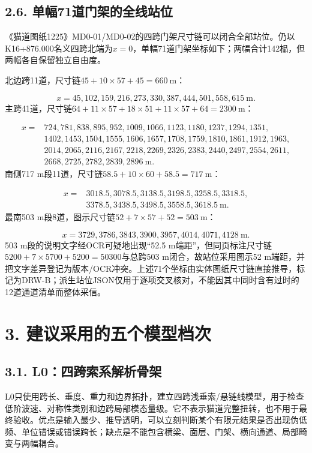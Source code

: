 \documentclass[UTF8,a4paper,11pt,fontset=none]{ctexart}
\begin{document}
\subsection*{2.6. 单幅71道门架的全线站位}
《猫道图纸1225》MD0-01/MD0-02的四跨门架尺寸链可以闭合全部站位。仍以K16+876.000名义四跨北端为\(x=0\)\allowbreak{}，单幅71道门架坐标如下；两幅合计142榀，但两幅各自保留独立自由度。\par
北边跨11道，尺寸链\(45+10\times57+45=660\ \mathrm m\)\allowbreak{}：\par
\[
x=45,102,159,216,273,330,387,444,501,558,615\ \mathrm m.
\]
主跨41道，尺寸链\(64+11\times57+18\times51+11\times57+64=2300\ \mathrm m\)\allowbreak{}：\par
\[
\begin{aligned}
x={}&724,781,838,895,952,1009,1066,1123,1180,1237,1294,1351,\\
&1402,1453,1504,1555,1606,1657,1708,1759,1810,1861,1912,1963,\\
&2014,2065,2116,2167,2218,2269,2326,2383,2440,2497,2554,2611,\\
&2668,2725,2782,2839,2896\ \mathrm m.
\end{aligned}
\]
南侧717 m段11道，尺寸链\(58.5+10\times60+58.5=717\ \mathrm m\)\allowbreak{}：\par
\[
\begin{aligned}
x={}&3018.5,3078.5,3138.5,3198.5,3258.5,3318.5,\\
&3378.5,3438.5,3498.5,3558.5,3618.5\ \mathrm m.
\end{aligned}
\]
最南503 m段8道，图示尺寸链\(52+7\times57+52=503\ \mathrm m\)\allowbreak{}：\par
\[
x=3729,3786,3843,3900,3957,4014,4071,4128\ \mathrm m.
\]
503 m段的说明文字经OCR可疑地出现“52.5 m端距”，但同页标注尺寸链\(5200+7\times5700+5200=50300\)\allowbreak{}与总跨503 m闭合，故站位采用图示52 m端距，并把文字差异登记为版本/OCR冲突。上述71个坐标由实体图纸尺寸链直接推导，标记为DRW-B；派生站位JSON仅用于逐项交叉核对，不能因其中同时含有过时的12道通道清单而整体采信。\par
{}
\section*{3. 建议采用的五个模型档次}
\subsection*{3.1. L0：四跨索系解析骨架}
L0只使用跨长、垂度、重力和边界拓扑，建立四跨浅垂索/悬链线模型，用于检查低阶波速、对称性类别和边跨局部模态量级。它不表示猫道完整扭转，也不用于最终验收。优点是输入最少、推导透明，可以立刻判断某个有限元结果是否出现伪低频、单位错误或错误跨长；缺点是不能包含横梁、面层、门架、横向通道、局部畸变与两幅耦合。\par
{}
\end{document}
